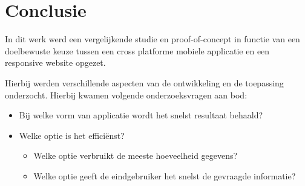 
\chapter{Conclusie}
\label{ch:conclusie}








In dit werk werd een vergelijkende studie en proof-of-concept in functie van een doelbewuste keuze tussen een
cross platforme mobiele applicatie en een responsive website opgezet.

Hierbij werden verschillende aspecten van de ontwikkeling
en de toepassing onderzocht. Hierbij kwamen volgende onderzoeksvragen aan bod:

\begin{itemize}
  \item{Bij welke vorm van applicatie wordt het snelst resultaat behaald?}
  \item{Welke optie is het efficiënst?}
  \begin{itemize}
    \item{Welke optie verbruikt de meeste hoeveelheid gegevens?}
    \item{Welke optie geeft de eindgebruiker het snelst de gevraagde informatie?}
  \end{itemize}
\end{itemize}

